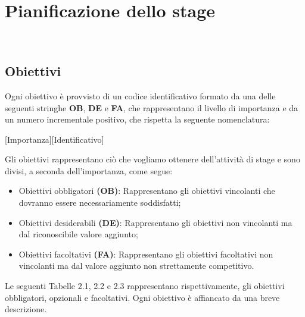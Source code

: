 \chapter{Pianificazione dello stage}
\label{cap:processi-metodologie}

\\


\section{Obiettivi}

Ogni obiettivo è provvisto di un codice identificativo formato da una delle seguenti stringhe \textbf{OB}, \textbf{DE} e \textbf{FA}, che rappresentano il livello di importanza e da un numero incrementale positivo, che rispetta la seguente nomenclatura:
\begin{center}
    [Importanza][Identificativo]
\end{center}
Gli obiettivi rappresentano ciò che vogliamo ottenere dell'attività di stage e sono divisi, a seconda dell'importanza, come segue:
\begin{itemize}
    \item Obiettivi obbligatori \textbf{(OB)}: 
    Rappresentano gli obiettivi vincolanti che dovranno essere necessariamente soddisfatti;
    \item Obiettivi desiderabili \textbf{(DE)}:
    Rappresentano gli obiettivi non vincolanti ma dal riconoscibile valore aggiunto;
    \item Obiettivi facoltativi \textbf{(FA)}:
    Rappresentano gli obiettivi facoltativi non vincolanti ma dal valore aggiunto non strettamente competitivo.
\end{itemize}
Le seguenti Tabelle 2.1, 2.2 e 2.3 rappresentano rispettivamente, gli obiettivi obbligatori, opzionali e facoltativi.
Ogni obiettivo è affiancato da una breve descrizione.


